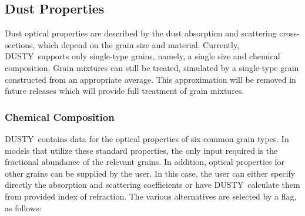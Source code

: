 \documentclass[11pt]{article}
\def\D  {{\sf DUSTY}}
\begin{document}
\subsection{Dust Properties}

Dust optical properties are described by the dust absorption and scattering
cross-sections, which depend on the grain size and  material. Currently, \D\
supports only single-type grains, namely, a single size and chemical
composition.  Grain mixtures can still be treated, simulated by a single-type
grain constructed from an appropriate average.  This approximation will be
removed in future releases which will provide full treatment of grain mixtures.

\subsubsection{Chemical Composition}
\label{chemistry}

\D\ contains data for the optical properties of six common grain types.  In
models that utilize these standard properties, the only input required is the
fractional abundance of the relevant grains.  In addition, optical properties
for other grains can be supplied by the user.  In this case, the user can
either specify directly the absorption and scattering coefficients or have \D\
calculate them from provided index of refraction. The various alternatives are
selected by a flag, as follows:
\end{document}

